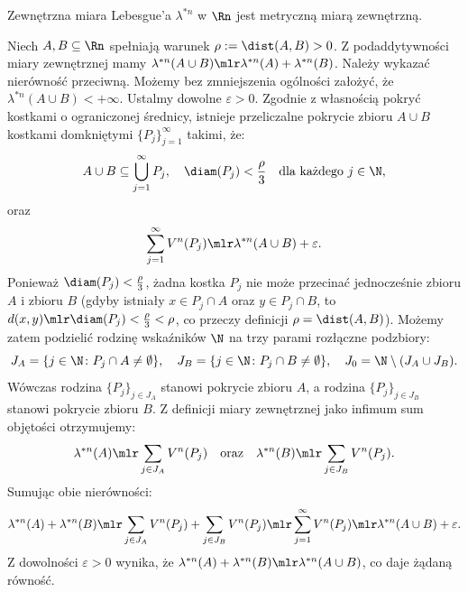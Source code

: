 \begin{tw}

    Zewnętrzna miara Lebesgue'a $\lambda^{*n}$ w $\Rn$ jest metryczną miarą zewnętrzną.

\end{tw}
\begin{dow} Niech $A, B \subseteq \Rn$ spełniają warunek $\rho := \dist(A, B) > 0$. Z podaddytywności miary zewnętrznej mamy $\lambda^{*n}(A \cup B) \mlr \lambda^{*n}(A) + \lambda^{*n}(B)$. Należy wykazać nierówność przeciwną. Możemy bez zmniejszenia ogólności założyć, że $\lambda^{*n}(A \cup B) < +\infty$. Ustalmy dowolne $\varepsilon > 0$. Zgodnie z własnością pokryć kostkami o ograniczonej średnicy, istnieje przeliczalne pokrycie zbioru $A \cup B$ kostkami domkniętymi $\{P_j\}_{j=1}^\infty$ takimi, że:
    \begin{equation*}
        A \cup B \subseteq \bigcup_{j=1}^\infty P_j, \quad \diam(P_j) < \frac{\rho}{3} \quad \text{dla każdego } j \in \N,
    \end{equation*}
    oraz
    \begin{equation*}
        \sum_{j=1}^\infty V^n(P_j) \mlr \lambda^{*n}(A \cup B) + \varepsilon.
    \end{equation*}
    Ponieważ $\diam(P_j) < \frac{\rho}{3}$, żadna kostka $P_j$ nie może przecinać jednocześnie zbioru $A$ i zbioru $B$ (gdyby istniały $x \in P_j \cap A$ oraz $y \in P_j \cap B$, to $d(x, y) \mlr \diam(P_j) < \frac{\rho}{3} < \rho$, co przeczy definicji $\rho = \dist(A, B)$). Możemy zatem podzielić rodzinę wskaźników $\N$ na trzy parami rozłączne podzbiory:
    \begin{equation*}
        J_A = \{j \in \N \colon P_j \cap A \neq \emptyset\}, \quad J_B = \{j \in \N \colon P_j \cap B \neq \emptyset\}, \quad J_0 = \N \setminus (J_A \cup J_B).
    \end{equation*}
    Wówczas rodzina $\{P_j\}_{j \in J_A}$ stanowi pokrycie zbioru $A$, a rodzina $\{P_j\}_{j \in J_B}$ stanowi pokrycie zbioru $B$. Z definicji miary zewnętrznej jako infimum sum objętości otrzymujemy:
    \begin{equation*}
        \lambda^{*n}(A) \mlr \sum_{j \in J_A} V^n(P_j) \quad \text{oraz} \quad \lambda^{*n}(B) \mlr \sum_{j \in J_B} V^n(P_j).
    \end{equation*}
    Sumując obie nierówności:
    \begin{equation*}
        \lambda^{*n}(A) + \lambda^{*n}(B) \mlr \sum_{j \in J_A} V^n(P_j) + \sum_{j \in J_B} V^n(P_j) \mlr \sum_{j=1}^\infty V^n(P_j) \mlr \lambda^{*n}(A \cup B) + \varepsilon.
    \end{equation*}
    Z dowolności $\varepsilon > 0$ wynika, że $\lambda^{*n}(A) + \lambda^{*n}(B) \mlr \lambda^{*n}(A \cup B)$, co daje żądaną równość.
\end{dow}
